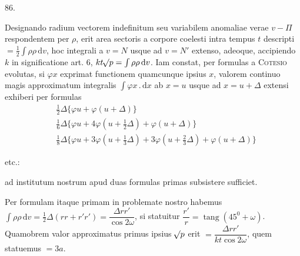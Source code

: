 \par{}\medskip
\hypertarget{native-115-article086}{}
\begin{center}86.\end{center}
Designando radium vectorem indefinitum seu variabilem anomaliae verae $v-\Pi$ respondentem per $\rho$, erit area sectoris a corpore coelesti intra tempus $t$ descripti $=\tfrac12\int\rho\rho\,\mathrm{d}v$, hoc integrali a $v=N$ usque ad $v=N'$ extenso, adeoque, accipiendo $k$ in significatione art. 6, $kt\mathord{{}^{}\!\surd}p=\int\rho\rho\,\mathrm{d}v$. Iam constat, per formulas a \textsc{Cotesio} evolutas, si $\varphi x$ exprimat functionem quamcunque ipsius $x$, valorem continuo magis approximatum integralis $\int\varphi x\mathbin{.}\mathrm{d}x$ ab $x=u$ usque ad $x=u+\Delta$ extensi exhiberi per formulas
\[
\begin{aligned}
&\tfrac12\Delta\{\varphi u+\varphi(u+\Delta)\}\\[4pt]
&\tfrac16\Delta\{\varphi u+4\varphi(u+\tfrac12\Delta)+\varphi(u+\Delta)\}\\[4pt]
&\tfrac18\Delta\{\varphi u+3\varphi(u+\tfrac13\Delta)+3\varphi(u+\tfrac23\Delta)+\varphi(u+\Delta)\}
\end{aligned}
\]
\centerline{etc.:}
\noindent ad institutum nostrum apud duas formulas primas subsistere sufficiet.

Per formulam itaque primam in problemate nostro habemus $\int\rho\rho\,\mathrm{d}v=\tfrac12\Delta(rr+r'r')=\dfrac{\Delta rr'}{\cos2\omega}$, si statuitur $\dfrac{r'}r=\operatorname{tang}(45^0+\omega)$. Quamobrem valor approximatus primus ipsius $\mathord{{}^{}\!\surd}p$ erit $=\dfrac{\Delta rr'}{kt\cos2\omega}$, quem statuemus $=3a$.

